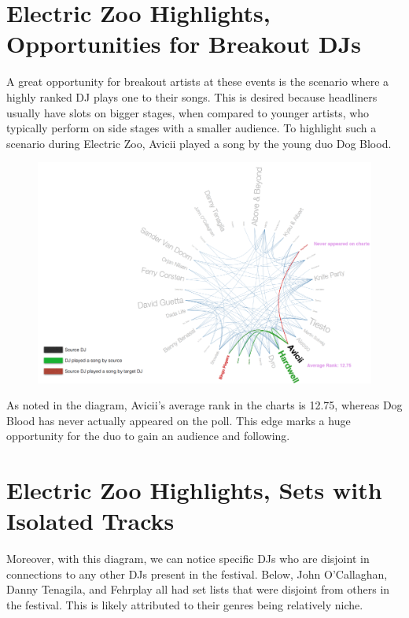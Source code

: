 \documentclass[12pt]{dalcsthesis}
\begin{document}
\section{Electric Zoo Highlights, Opportunities for Breakout DJs}

A great opportunity for breakout artists at these events is the scenario where a highly ranked DJ plays one to their songs. This is desired because headliners usually have slots on bigger stages, when compared to younger artists, who typically perform on side stages with a smaller audience. To highlight such a scenario during Electric Zoo, Avicii played a song by the young duo Dog Blood. \newpage

\begin{figure}[h]
\includegraphics[scale=.5]{avicii_dog_blood}
\centering
\end{figure}

As noted in the diagram, Avicii's average rank in the charts is 12.75, whereas Dog Blood has never actually appeared on the poll. This edge marks a huge opportunity for the duo to gain an audience and following.

\section{Electric Zoo Highlights, Sets with Isolated Tracks}

Moreover, with this diagram, we can notice specific DJs who are disjoint in connections to any other DJs present in the festival. Below, John O'Callaghan, Danny Tenagila, and Fehrplay all had set lists that were disjoint from others in the festival. This is likely attributed to their genres being relatively niche. \newpage
\end{document}

